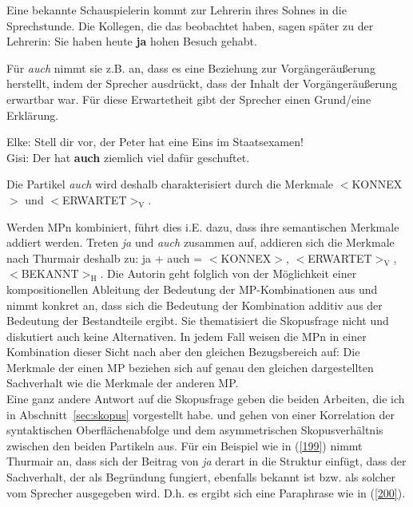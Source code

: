 \begin{exe}
	\ex\label{198a} 
	Eine bekannte Schauspielerin kommt zur Lehrerin ihres Sohnes in die Sprechstunde. Die Kollegen, die das beobachtet haben, sagen später zu der 				Lehrerin: \glqq Sie haben heute \textbf{ja} hohen Besuch gehabt.\grqq{}
	\hfill\hbox {\citet[104]{Thurmair1989}}
\end{exe}
Für \textit{auch} nimmt sie z.B. an, dass es eine Beziehung zur Vorgängeräußerung herstellt, indem der Sprecher ausdrückt, dass der Inhalt der Vorgängeräußerung erwartbar war. Für diese Erwartetheit gibt der Sprecher einen Grund/eine Er\-klärung.

\begin{exe}
	\ex\label{198} 
	Elke: Stell dir vor, der Peter hat eine Eins im Staatsexamen!\\
	Gisi: Der hat \textbf{auch} ziemlich viel dafür geschuftet.
	\hfill\hbox {\citet[155]{Thurmair1989}}
\end{exe}
Die Partikel \textit{auch} wird deshalb charakterisiert durch die Merkmale $<$KONNEX$>$ und $<$\textrm{ERWARTET}$>_{\textrm{V}}$.

Werden MPn kombiniert, führt dies i.E. dazu, dass ihre semantischen Merkmale  addiert werden. Treten \textit{ja} und \textit{auch} zusammen auf, addieren sich die Merkmale nach Thurmair deshalb zu: ja + auch = $<$KONNEX$>$, $<$\textrm{ERWARTET}$>_{\textrm{V}}$, \\$<$\textrm{BEKANNT}$>_{\textrm{H}}$. Die Autorin geht folglich von der Möglichkeit einer kompositionellen Ableitung der Bedeutung der MP-Kombinationen aus und nimmt konkret an, dass sich die Bedeutung der Kombination additiv aus der Bedeutung der Bestandteile ergibt. Sie thematisiert die Skopusfrage nicht und diskutiert auch keine Alternativen. In jedem Fall weisen die MPn in einer Kombination dieser Sicht nach aber den glei\-chen Bezugsbereich auf: Die Merkmale der einen MP beziehen sich auf genau den gleichen dargestellten Sachverhalt wie die Merkmale der anderen MP.\\

\noindent
Eine ganz andere Antwort auf die Skopusfrage  geben die beiden Arbeiten, die ich in Abschnitt~\ref{sec:skopus} vorgestellt habe. \citet{Ormelius-Sandblom1997} und \citet{Rinas2007} gehen von einer Korrelation der syntaktischen Oberflächenabfolge und dem asymmetrischen Skopusverhältnis zwischen den beiden Partikeln aus. Für ein Beispiel wie in (\ref{199}) nimmt Thurmair an, dass sich der Beitrag von \textit{ja} derart in die Struktur einfügt, dass der Sachverhalt, der als Begründung fungiert, ebenfalls bekannt ist bzw. als solcher vom Sprecher ausgegeben wird. D.h. es ergibt sich eine Paraphrase wie in (\ref{200}).

